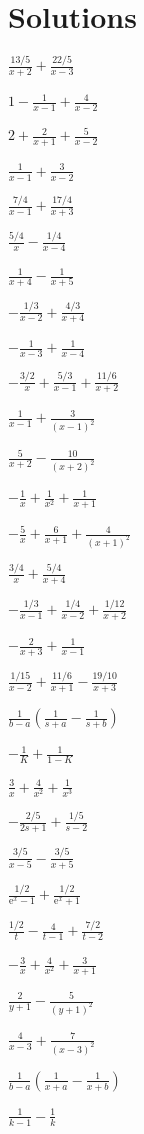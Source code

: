 \section{Solutions}

\begin{solutions}
  \item $\displaystyle\frac{13/5}{x+2}+\frac{22/5}{x-3}$
  \item $1-\displaystyle\frac{1}{x-1}+\frac{4}{x-2}$
  \item $2+\displaystyle\frac{2}{x+1}+\frac{5}{x-2}$
  \item $\displaystyle\frac{1}{x-1}+\frac{3}{x-2}$
  \item $\displaystyle\frac{7/4}{x-1}+\frac{17/4}{x+3}$
  \item $\displaystyle\frac{5/4}{x}-\frac{1/4}{x-4}$
  \item $\displaystyle\frac{1}{x+4}-\frac{1}{x+5}$
  \item $\displaystyle-\frac{1/3}{x-2}+\frac{4/3}{x+4}$
  \item $\displaystyle-\frac{1}{x-3}+\frac{1}{x-4}$
  \item $\displaystyle-\frac{3/2}{x}+\frac{5/3}{x-1}+\frac{11/6}{x+2}$
  \item $\displaystyle\frac{1}{x-1}+\frac{3}{(x-1)^{2}}$
  \item $\displaystyle\frac{5}{x+2}-\frac{10}{(x+2)^{2}}$
  \item $\displaystyle-\frac{1}{x}+\frac{1}{x^{2}}+\frac{1}{x+1}$
  \item $\displaystyle-\frac{5}{x}+\frac{6}{x+1}+\frac{4}{(x+1)^{2}}$
  \item $\displaystyle\frac{3/4}{x}+\frac{5/4}{x+4}$
  \item $\displaystyle-\frac{1/3}{x-1}+\frac{1/4}{x-2}+\frac{1/12}{x+2}$
  \item $\displaystyle-\frac{2}{x+3}+\frac{1}{x-1}$
  \item $\displaystyle\frac{1/15}{x-2}+\frac{11/6}{x+1}-\frac{19/10}{x+3}$
  \item $\displaystyle\frac{1}{b-a}\left(\frac{1}{s+a}-\frac{1}{s+b}\right)$
  \item $\displaystyle-\frac{1}{K}+\frac{1}{1-K}$
  \item $\displaystyle\frac{3}{x}+\frac{4}{x^{2}}+\frac{1}{x^{3}}$
  \item $\displaystyle-\frac{2/5}{2s+1}+\frac{1/5}{s-2}$
  \item $\displaystyle\frac{3/5}{x-5}-\frac{3/5}{x+5}$
  \item $\displaystyle\frac{1/2}{\mathrm{e}^{x}-1}+\frac{1/2}{\mathrm{e}^{x}+1}$
  \item $\displaystyle\frac{1/2}{t}-\frac{4}{t-1}+\frac{7/2}{t-2}$
  \item $\displaystyle-\frac{3}{x}+\frac{4}{x^{2}}+\frac{3}{x+1}$
  \item $\displaystyle\frac{2}{y+1}-\frac{5}{(y+1)^{2}}$
  \item $\displaystyle\frac{4}{x-3}+\frac{7}{(x-3)^{2}}$
  \item $\displaystyle\frac{1}{b-a}\left(\frac{1}{x+a}-\frac{1}{x+b}\right)$
  \item $\displaystyle\frac{1}{k-1}-\frac{1}{k}$
\end{solutions}
